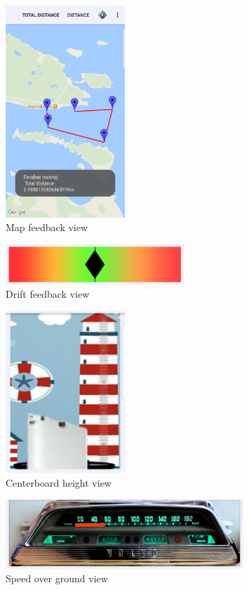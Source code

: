 \begin{figure}[H]
\centering
\includegraphics[width=0.4\textwidth]{Figures/map.png}
\caption{Map feedback view}
\label{feedback-map}
\end{figure}
\begin{figure}[H]
\centering
\includegraphics[width=0.6\textwidth]{Figures/drift.png}
\caption{Drift feedback view}
\label{feedback-drift}
\end{figure}
\begin{figure}[H]
\centering
\includegraphics[width=0.4\textwidth]{Figures/height.png}
\caption{Centerboard height view}
\label{feedback-height}
\end{figure}
\begin{figure}[H]
\centering
\includegraphics[width=0.8\textwidth]{Figures/sog.png}
\caption{Speed over ground view}
\label{feedback-sog}
\end{figure}
